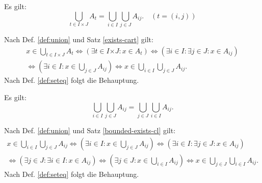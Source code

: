 \begin{Satz}\label{cup-cart}
Es gilt:
\[\bigcup_{t\in I\times J} A_t
= \bigcup_{i\in I}\bigcup_{j\in J} A_{ij}.\quad (t=(i,j))\]
\end{Satz}

\begin{Beweis}
Nach Def. \ref{def:union} und Satz \ref{exists-cart} gilt:
\begin{gather*}
x\in \bigcup_{t\in I\times J} A_t
\iff (\exists t\in I{\times J}\colon x\in A_t)
\iff (\exists i{\in}I\colon\exists j{\in}J\colon x\in A_{ij})\\
\iff (\exists i{\in}I\colon x\in \bigcup_{j\in J} A_{ij})
\iff x\in\bigcup_{i\in I}\bigcup_{j\in J} A_{ij}.
\end{gather*}
Nach Def. \ref{def:seteq} folgt die Behauptung.\,\qedsymbol
\end{Beweis}

\begin{Satz}
Es gilt:
\[\bigcup_{i\in I}\bigcup_{j\in J} A_{ij}
= \bigcup_{j\in J}\bigcup_{i\in I} A_{ij}.\]
\end{Satz}

\begin{Beweis}
Nach Def. \ref{def:union} und Satz \ref{bounded-exists-cl} gilt:
\begin{gather*}
x\in\bigcup_{i\in I}\bigcup_{j\in J} A_{ij}
\iff (\exists i{\in}I\colon x\in\bigcup_{j\in J} A_{ij})
\iff (\exists i{\in}I\colon\exists j{\in}J\colon x\in A_{ij})\\
\iff (\exists j{\in}J\colon\exists i{\in}I\colon x\in A_{ij})
\iff (\exists j{\in}J\colon x\in \bigcup_{i\in I}A_{ij})
\iff x\in\bigcup_{j\in J}\bigcup_{i\in I} A_{ij}.
\end{gather*}
Nach Def. \ref{def:seteq} folgt die Behauptung.\,\qedsymbol
\end{Beweis}

